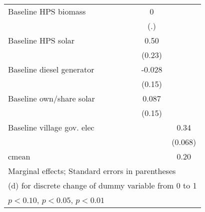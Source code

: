 \begin{table}[htbp]
\begin{tabular*}{1\hsize}{@{\hskip\tabcolsep\extracolsep\fill}l*{6}{c}}
Baseline HPS biomass&                  &                  &                  &                  &        0         &                  \\
                &                  &                  &                  &                  &      (.)         &                  \\
Baseline HPS solar&                  &                  &                  &                  &     0.50\sym{**} &                  \\
                &                  &                  &                  &                  &   (0.23)         &                  \\
Baseline diesel generator&                  &                  &                  &                  &   -0.028         &                  \\
                &                  &                  &                  &                  &   (0.15)         &                  \\
Baseline own/share solar&                  &                  &                  &                  &    0.087         &                  \\
                &                  &                  &                  &                  &   (0.15)         &                  \\
Baseline village gov. elec&                  &                  &                  &                  &                  &     0.34\sym{***}\\
                &                  &                  &                  &                  &                  &  (0.068)         \\
\midrule
cmean           &                  &                  &                  &                  &                  &     0.20         \\
\bottomrule
\multicolumn{7}{l}{\footnotesize Marginal effects; Standard errors in parentheses}\\
\multicolumn{7}{l}{\footnotesize  (d) for discrete change of dummy variable from 0 to 1}\\
\multicolumn{7}{l}{\footnotesize \sym{*} \(p<0.10\), \sym{**} \(p<0.05\), \sym{***} \(p<0.01\)}\\
\end{tabular*}
\end{table}
